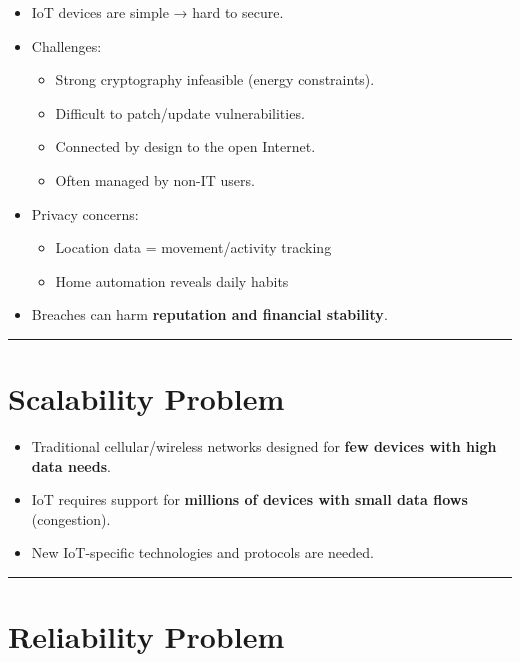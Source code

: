 \documentclass[a4paper, 12pt]{book} %
\begin{document}
\begin{itemize}
\tightlist
\item
  IoT devices are simple → hard to secure.
\item
  Challenges:

  \begin{itemize}
  \tightlist
  \item
    Strong cryptography infeasible (energy constraints).
  \item
    Difficult to patch/update vulnerabilities.
  \item
    Connected by design to the open Internet.
  \item
    Often managed by non-IT users.
  \end{itemize}
\item
  Privacy concerns:

  \begin{itemize}
  \tightlist
  \item
    Location data = movement/activity tracking
  \item
    Home automation reveals daily habits
  \end{itemize}
\item
  Breaches can harm \textbf{reputation and financial stability}.
\end{itemize}

\begin{center}\rule{0.5\linewidth}{0.5pt}\end{center}

\section{Scalability Problem}\label{scalability-problem}

\begin{itemize}
\tightlist
\item
  Traditional cellular/wireless networks designed for \textbf{few
  devices with high data needs}.
\item
  IoT requires support for \textbf{millions of devices with small data
  flows} (congestion).
\item
  New IoT-specific technologies and protocols are needed.
\end{itemize}

\begin{center}\rule{0.5\linewidth}{0.5pt}\end{center}

\section{Reliability Problem}\label{reliability-problem}
\end{document}
